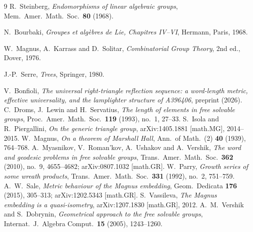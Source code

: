 \documentclass[11pt]{article}
\theoremstyle{definition}
\theoremstyle{remark}
\begin{document}
\begin{thebibliography}{9}
 R.~Steinberg, \emph{Endomorphisms of linear algebraic
groups}, Mem.\ Amer.\ Math.\ Soc.\ \textbf{80} (1968).

 N.~Bourbaki, \emph{Groupes et alg\`ebres de Lie,
Chapitres IV--VI}, Hermann, Paris, 1968.

 W.~Magnus, A.~Karrass and D.~Solitar, \emph{Combinatorial Group
Theory}, 2nd ed., Dover, 1976.

 J.-P.~Serre, \emph{Trees}, Springer, 1980.

 V.~Bonfioli, \emph{The universal right-triangle reflection
sequence: a word-length metric, effective universality, and the lamplighter
structure of A396406}, preprint (2026).
 C.~Droms, J.~Lewin and H.~Servatius, \emph{The length of elements
in free solvable groups}, Proc.\ Amer.\ Math.\ Soc.\ \textbf{119} (1993),
no.~1, 27--33.
 S.~Isola and R.~Piergallini, \emph{On the generic triangle group},
arXiv:1405.1881 [math.MG], 2014--2015.
 W.~Magnus, \emph{On a theorem of Marshall Hall}, Ann.\ of
Math.\ (2) \textbf{40} (1939), 764--768.
 A.~Myasnikov, V.~Roman'kov, A.~Ushakov and A.~Vershik, \emph{The
word and geodesic problems in free solvable groups}, Trans.\ Amer.\ Math.\ Soc.\
\textbf{362} (2010), no.~9, 4655--4682; arXiv:0807.1032 [math.GR].
\bibitem{Parry} W.~Parry, \emph{Growth series of some wreath products}, Trans.\
Amer.\ Math.\ Soc.\ \textbf{331} (1992), no.~2, 751--759.
\bibitem{Sale} A.~W.~Sale, \emph{Metric behaviour of the Magnus embedding},
Geom.\ Dedicata \textbf{176} (2015), 305--313; arXiv:1202.5343 [math.GR].
\bibitem{Vassileva} S.~Vassileva, \emph{The Magnus embedding is a
quasi-isometry}, arXiv:1207.1830 [math.GR], 2012.
\bibitem{VD} A.~M.~Vershik and S.~Dobrynin, \emph{Geometrical approach to the
free solvable groups}, Internat.\ J.\ Algebra Comput.\ \textbf{15} (2005),
1243--1260.
\end{thebibliography}
\end{document}
